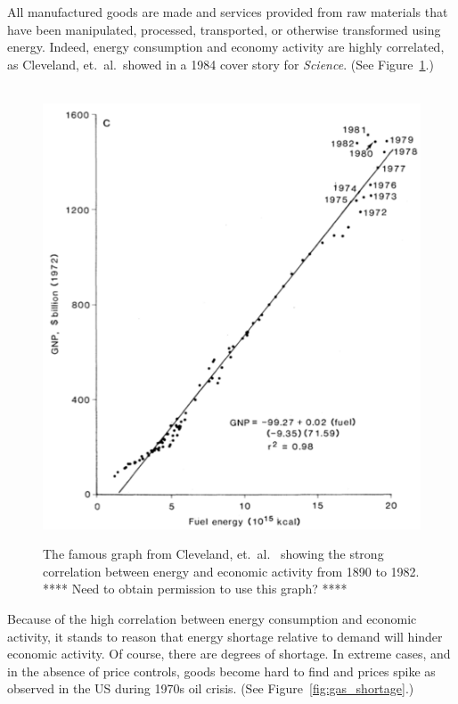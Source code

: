 All manufactured goods are made and services provided
from raw materials that have been
manipulated, processed, transported, or otherwise transformed using energy.
Indeed, energy consumption and economy activity are highly correlated,
as Cleveland, et.\ al.\ showed in a 1984 cover story for \emph{Science}. 
(See Figure~\ref{fig:Cleveland1984}.)

\begin{figure}[!ht]
\centering\
\includegraphics[width=\linewidth]{Part_0/Chapter_Introduction/images/Cleveland1984.pdf}
\caption[Energy and economic activity]{The famous graph from Cleveland, et.\ al.\
\cite{Cleveland:1984aa} showing the strong correlation 
between energy and economic activity from 1890 to 1982.
**** Need to obtain permission to use this graph? ****}
\label{fig:Cleveland1984}
\end{figure}

Because of the high correlation between energy consumption and economic activity,
it stands to reason that energy shortage relative to demand will hinder economic activity.
Of course, there are degrees of shortage. 
In extreme cases, and in the absence of price controls,
goods become hard to find and prices spike
as observed in the US during 1970s oil crisis.
(See Figure~\ref{fig:gas_shortage}.)

